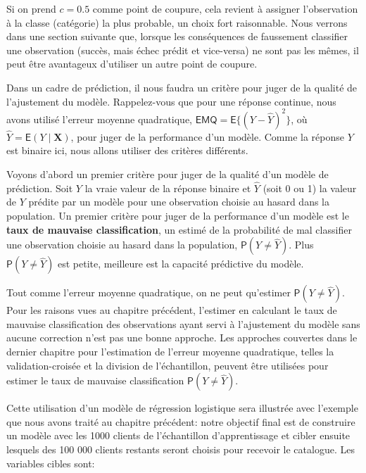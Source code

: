 \documentclass[
  11pt,
  letterpaper,
]{book}
\theoremstyle{definition}
\theoremstyle{definition}
\theoremstyle{definition}
\theoremstyle{definition}
\theoremstyle{remark}
\begin{document}
Si on prend \(c=0.5\) comme point de coupure, cela revient à assigner l'observation à la classe (catégorie) la plus probable, un choix fort raisonnable. Nous verrons dans une section suivante que, lorsque les conséquences de faussement classifier une observation (succès, mais échec prédit et vice-versa) ne sont pas les mêmes, il peut être avantageux d'utiliser un autre point de coupure.

Dans un cadre de prédiction, il nous faudra un critère pour juger de la qualité de l'ajustement du modèle.
Rappelez-vous que pour une réponse continue, nous avons utilisé l'erreur moyenne quadratique,
\(\mathsf{EMQ} = \mathsf{E}\{(Y-\widehat{Y})^2\}\), où \(\widehat{Y} = \mathsf{E}(Y \mid \mathbf{X})\),
pour juger de la performance d'un modèle. Comme la réponse \(Y\) est binaire ici, nous allons utiliser des critères différents.

Voyons d'abord un premier critère pour juger de la qualité d'un modèle de prédiction. Soit \(Y\) la vraie valeur de la réponse binaire et \(\widehat{Y}\) (soit 0 ou 1) la valeur de \(Y\) prédite par un modèle pour une observation choisie au hasard dans la population. Un premier critère pour juger de la performance d'un modèle est le \textbf{taux de mauvaise classification}, un estimé de la probabilité de mal classifier une observation choisie au hasard dans la population, \({\mathsf P}\left(Y \neq\widehat{Y}\right)\). Plus \({\mathsf P}\left(Y \neq\widehat{Y}\right)\) est petite, meilleure est la capacité prédictive du modèle.

Tout comme l'erreur moyenne quadratique, on ne peut qu'estimer \({\mathsf P}\left(Y \neq\widehat{Y}\right)\). Pour les raisons vues au chapitre précédent, l'estimer en calculant le taux de mauvaise classification des observations ayant servi à l'ajustement du modèle sans aucune correction n'est pas une bonne approche. Les approches couvertes dans le dernier chapitre pour l'estimation de l'erreur moyenne quadratique, telles la validation-croisée et la
division de l'échantillon, peuvent être utilisées pour estimer le taux de mauvaise classification \({\mathsf P}\left(Y \neq \widehat{Y}\right)\).

Cette utilisation d'un modèle de régression logistique sera illustrée avec l'exemple que nous avons traité au chapitre précédent: notre objectif final est de construire un modèle avec les 1000 clients de l'échantillon d'apprentissage et cibler ensuite lesquels des 100 000 clients restants seront choisis pour recevoir le catalogue. Les variables cibles sont:
\end{document}
